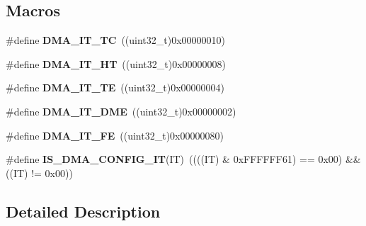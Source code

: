 \subsection*{Macros}
\begin{DoxyCompactItemize}
\item 
\mbox{\label{group___d_m_a__interrupt__enable__definitions_ga06e83dd277e0d3e5635cf8ce8dfd6e16}} 
\#define {\bfseries D\+M\+A\+\_\+\+I\+T\+\_\+\+TC}~((uint32\+\_\+t)0x00000010)
\item 
\mbox{\label{group___d_m_a__interrupt__enable__definitions_gadf11c572b9797e04a14b105fdc2e5f66}} 
\#define {\bfseries D\+M\+A\+\_\+\+I\+T\+\_\+\+HT}~((uint32\+\_\+t)0x00000008)
\item 
\mbox{\label{group___d_m_a__interrupt__enable__definitions_gaf9d92649d2a0146f663ff253d8f3b59e}} 
\#define {\bfseries D\+M\+A\+\_\+\+I\+T\+\_\+\+TE}~((uint32\+\_\+t)0x00000004)
\item 
\mbox{\label{group___d_m_a__interrupt__enable__definitions_ga71137443f7bdced1ee80697596e9ea98}} 
\#define {\bfseries D\+M\+A\+\_\+\+I\+T\+\_\+\+D\+ME}~((uint32\+\_\+t)0x00000002)
\item 
\mbox{\label{group___d_m_a__interrupt__enable__definitions_ga93164ec039fc5579662c382e68d7d13f}} 
\#define {\bfseries D\+M\+A\+\_\+\+I\+T\+\_\+\+FE}~((uint32\+\_\+t)0x00000080)
\item 
\mbox{\label{group___d_m_a__interrupt__enable__definitions_ga47f6af7da302c19aba24516037d305e7}} 
\#define {\bfseries I\+S\+\_\+\+D\+M\+A\+\_\+\+C\+O\+N\+F\+I\+G\+\_\+\+IT}(IT)~((((IT) \& 0x\+F\+F\+F\+F\+F\+F61) == 0x00) \&\& ((\+I\+T) != 0x00))
\end{DoxyCompactItemize}


\subsection{Detailed Description}
